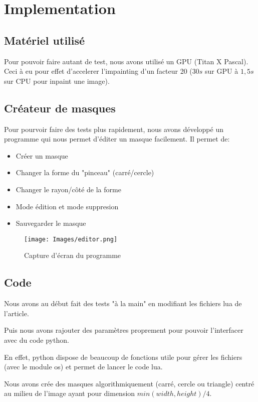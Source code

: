 \documentclass[12pt]{article}
\begin{document}
\newpage

\section{Implementation}

\subsection{Matériel utilisé}
Pour pouvoir faire autant de test, nous avons utilisé un GPU (Titan X
Pascal). Ceci à eu pour effet d'accelerer l'impainting d'un facteur 20
($30s$ sur GPU à $1,5s$ sur CPU pour inpaint une image).

\subsection{Créateur de masques}
Pour pourvoir faire des tests plus rapidement, nous avons développé
un programme qui nous permet d'éditer un masque facilement.
Il permet de:
\begin{itemize}
\item Créer un masque
\item Changer la forme du "pinceau" (carré/cercle)
\item Changer le rayon/côté de la forme
\item Mode édition et mode suppresion
\item Sauvegarder le masque
\end{itemize}

\begin{figure}[htb]
\centering
  \texttt{[image: Images/editor.png]}
  \caption{Capture d'écran du programme}
\end{figure}

\subsection{Code}
Nous avons au début fait des tests "à la main" en modifiant les fichiers
lua de l'article.

Puis nous avons rajouter des paramètres proprement pour pouvoir
l'interfacer avec du code python.

En effet, python dispose de beaucoup de fonctions utile pour gérer les
fichiers (avec le module os) et permet de lancer le code lua.


Nous avons crée des masques algorithmiquement (carré,
cercle ou triangle) centré au milieu de l'image ayant pour dimension
$min(width, height)/4$.
\end{document}
